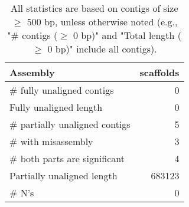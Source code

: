 \documentclass[12pt,a4paper]{article}
\begin{document}
\begin{table}[ht]
\begin{center}
\caption{All statistics are based on contigs of size $\geq$ 500 bp, unless otherwise noted (e.g., "\# contigs ($\geq$ 0 bp)" and "Total length ($\geq$ 0 bp)" include all contigs).}
\begin{tabular}{|l*{1}{|r}|}
\hline
Assembly & scaffolds \\ \hline
\# fully unaligned contigs & 0 \\ \hline
Fully unaligned length & 0 \\ \hline
\# partially unaligned contigs & 5 \\ \hline
\hspace{5mm}\# with misassembly & 3 \\ \hline
\hspace{5mm}\# both parts are significant & 4 \\ \hline
Partially unaligned length & 683123 \\ \hline
\# N's & 0 \\ \hline
\end{tabular}
\end{center}
\end{table}
\end{document}
